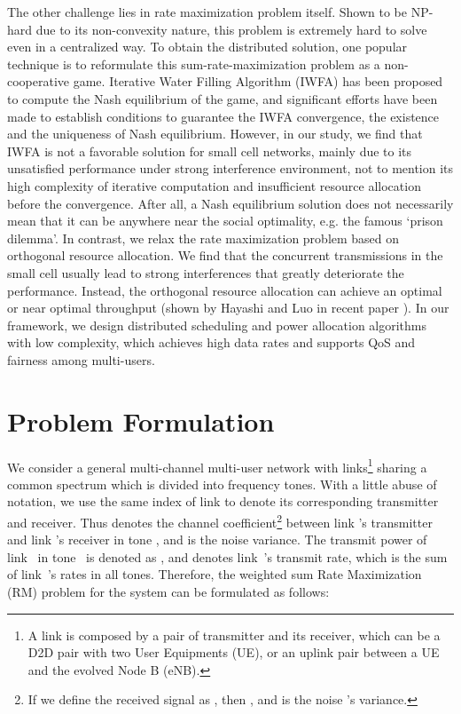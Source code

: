 \documentclass[conference]{IEEEtran}
\begin{document}
The other challenge lies in rate maximization problem itself. Shown to be NP-hard\cite{luo2008dynamic} due to its non-convexity nature, this problem is extremely hard to solve even in a centralized way. To obtain the distributed solution, one popular technique is to reformulate this sum-rate-maximization problem as a non-cooperative game. Iterative Water Filling Algorithm (IWFA)\cite{yu2002distributed} has been proposed to compute the Nash equilibrium of the game, and significant efforts \cite{yu2002distributed,scutari2008optimal, luo2006analysis} have been made to establish conditions to guarantee the IWFA convergence, the existence and the uniqueness of Nash equilibrium. However, in our study, we find that IWFA is not a favorable solution for small cell networks, mainly due to its unsatisfied performance under strong interference environment, not to mention its high complexity of iterative computation and insufficient resource allocation before the convergence. After all, a Nash equilibrium solution does not necessarily mean that it can be anywhere near the social optimality, e.g. the famous  `prison dilemma'.
In contrast, we relax the rate maximization problem based on orthogonal resource allocation. We find that the concurrent transmissions in the small cell usually lead to strong interferences that greatly deteriorate the performance. Instead, the orthogonal resource allocation can achieve an optimal or near optimal throughput (shown by Hayashi and Luo in recent paper \cite{hayashi2009spectrum}). In our framework, we design distributed scheduling and power allocation algorithms with low complexity, which achieves high data rates and supports QoS and fairness among multi-users.


\section{Problem Formulation}
We consider a general multi-channel multi-user network with  links\footnote{A link is composed by a pair of transmitter and its receiver, which can be a D2D pair with two User Equipments (UE), or an uplink pair between a UE and the evolved Node B (eNB).} sharing a common spectrum which is divided into  frequency tones. With a little abuse of notation, we use the same index of link to denote its corresponding transmitter and receiver. Thus  denotes the channel coefficient\footnote{If we define the received signal as , then , and  is the noise 's variance.} between link 's transmitter and link 's receiver in tone , and  is the noise variance. The transmit power of link~ in tone~ is denoted as , and  denotes link~'s transmit rate, which is the sum of link~'s rates in all tones.
Therefore, the weighted sum Rate Maximization (RM) problem for the system can be formulated as follows:
\end{document}
